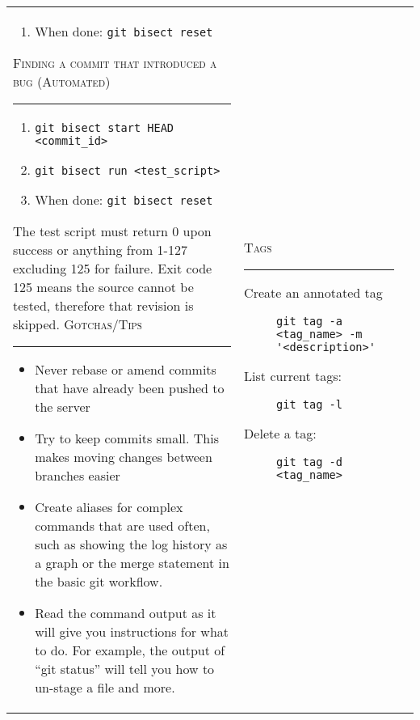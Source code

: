 \documentclass[landscape]{article}
\begin{document}
\begin{tabular*}{10.5in}{|p{2.9in}|p{2.9in}|p{2.9in}|}
\begin{flushleft}
\begin{enumerate}
\begin{itemize}
                \end{itemize}
            \item{When done: \verb!git bisect reset!}
        \end{enumerate}
        \textsc{Finding a commit that introduced a bug (Automated)}
        \rule{2.9in}{.5pt}
        \small
        \begin{enumerate}
            \item{\verb!git bisect start HEAD <commit_id>!}
            \item{\verb!git bisect run <test_script>!}
            \item{When done: \verb!git bisect reset!}
        \end{enumerate}
        \normalsize{The test script must return 0 upon success or anything
        from 1-127 excluding 125 for failure.  Exit code 125 means the source
        cannot be tested, therefore that revision is skipped.}
        \textsc{Gotchas/Tips}
        \rule{2.9in}{.5pt}
        \small
        \begin{itemize}
            \item{Never rebase or amend commits that have already been pushed
                to the server}
            \item{Try to keep commits small.  This makes moving changes between
                branches easier}
            \item{Create aliases for complex commands that are used often,
                such as showing the log history as a graph or the merge
                statement in the basic git workflow.}
            \item{Read the command output as it will give you instructions for
                what to do.  For example, the output of ``git status'' will
                tell you how to un-stage a file and more.}
        \end{itemize}
    \end{flushleft}
    &
    \begin{flushleft}
        \textsc{Tags}
        \rule{2.9in}{.5pt}
        \small
        \begin{description}
            \item[Create an annotated tag]
                {\verb!git tag -a <tag_name> -m '<description>'!}
            \item[List current tags:]
                {\verb!git tag -l!}
            \item[Delete a tag:]
                {\verb!git tag -d <tag_name>!}

\end{description}
\end{flushleft}
\end{tabular*}
\end{document}
